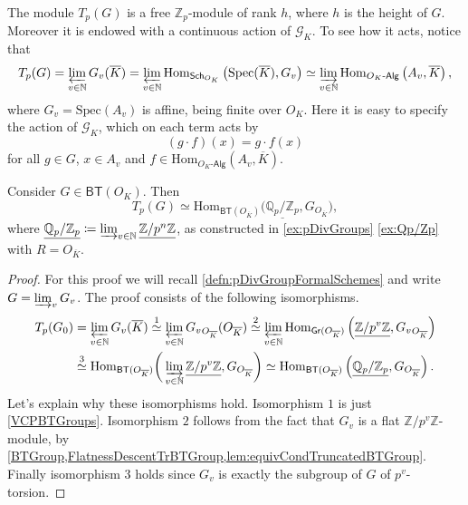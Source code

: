 \begin{rem}[]\label{rem:TateModuleProperties}
	The module $T_p(G)$ is a free $\mathbb{Z}_{p}$-module of rank $h$,
	where $h$ is the height of $G$.
	Moreover it is endowed with a continuous action of $\mathscr{G}_K$.
	To see how it acts, notice that
	\begin{equation*}
		T_p(G) = \varprojlim_{v \in \mathbb{N}} G_v(\overline{K}) =
		\varprojlim_{v \in \mathbb{N}} \mathrm{Hom}_{ \mathsf{Sch}_{ O_K } } 
		\left( \mathrm{Spec}(\overline{K}), G_v \right) \simeq
		\varinjlim_{v \in \mathbb{N}} \mathrm{Hom}_{ O_K\text{-}\mathsf{Alg} }
		\left( A_v, \overline{K} \right)
	,\end{equation*}
	where $G_v = \mathrm{Spec}(A_v)$ is affine, being finite over $O_K$.
	Here it is easy to specify the action of $\mathscr{G}_K$, which on each term acts by
	\begin{equation*}
		\left( g \cdot f \right)(x) = g \cdot f(x)
	\end{equation*}
	for all $g \in G$, $x \in A_v$ and $f \in \mathrm{Hom}_{ O_K\text{-}\mathsf{Alg} } 
	\left( A_v, \overline{K}\right)$.
\end{rem}


\begin{prop}[]\label{AlternativeDefnTateModule}
	Consider $G \in \mathsf{BT}(O_K)$.
	Then
	\begin{equation*}
		T_p(G) \simeq \mathrm{Hom}_{ \mathsf{BT}(O_{\overline{K}}) }
		\big( \underline{\mathbb{Q}_p/\mathbb{Z}_{p}}, G_{O_{\overline{K}}} \big)
	,\end{equation*}
	where $\underline{\mathbb{Q}_p/\mathbb{Z}_{p}} \coloneqq \varinjlim_{v \in \mathbb{N}}
	\underline{\mathbb{Z}/p^n\mathbb{Z}}$, as constructed 
	in \cref{ex:pDivGroups} \cref{ex:Qp/Zp} with $R = O_{\overline{K}}$.
\end{prop}
\begin{proof}
	For this proof we will recall \cref{defn:pDivGroupFormalSchemes}
	and write $G = \varinjlim_v G_v$.
	The proof consists of the following isomorphisms.
	\begin{align*}
		T_p(G_0) &= \varprojlim_{v \in \mathbb{N}} G_v(\overline{K})
		\stackrel{1}{\simeq} \varprojlim_{v \in \mathbb{N}} {G_v}_{O_{\overline{K}}}(O_{\overline{K}})
		\stackrel{2}{\simeq} \varprojlim_{v \in \mathbb{N}}
		\mathrm{Hom}_{ \mathsf{Gr}(O_{\overline{K}}) }
		\left( \underline{\mathbb{Z}/p^v\mathbb{Z}}, {G_v}_{O_{\overline{K}}} \right) \\
		&\stackrel{3}{\simeq} 
		\mathrm{Hom}_{ \mathsf{BT}(O_{\overline{K}}) } 
		\bigg( \varinjlim_{v \in \mathbb{N}} \underline{\mathbb{Z}/p^v\mathbb{Z}}, G_{O_{\overline{K}}} \bigg) 
		\simeq \mathrm{Hom}_{ \mathsf{BT}(O_{\overline{K}}) } 
		\left( \underline{\mathbb{Q}_p/\mathbb{Z}_{p}}, G_{O_{\overline{K}}} \right)
	.\end{align*}
	Let's explain why these isomorphisms hold.
	Isomorphism $1$ is just \cref{VCPBTGroups}.
	Isomorphism $2$ follows from the fact that $G_v$ is
	a flat $\mathbb{Z}/p^v\mathbb{Z}$-module, by 
	\cref{BTGroup,FlatnessDescentTrBTGroup,lem:equivCondTruncatedBTGroup}.
	Finally isomorphism $3$ holds since $G_v$ is exactly the
	subgroup of $G$ of $p^v$-torsion.
\end{proof}


